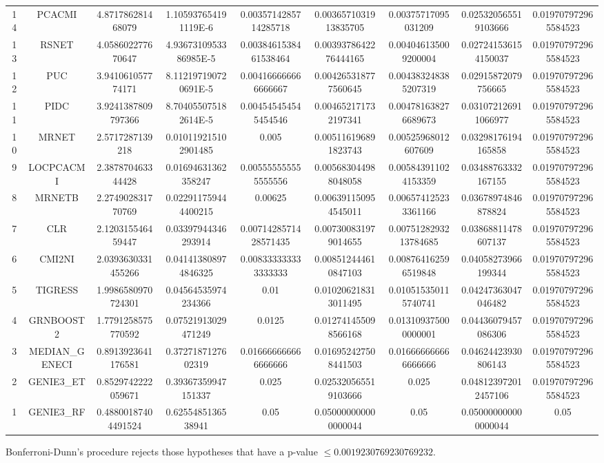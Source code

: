 \documentclass[a4paper,10pt]{article}
\begin{document}
\begin{landscape}
\begin{table}[!htp]
\begin{tabular}{ccccccccc}
14&PCACMI&4.871786281468079&1.105937654191119E-6&0.0035714285714285718&0.0036571031913835705&0.00375717095031209&0.025320565519103666&0.019707972965584523\\
13&RSNET&4.058602277670647&4.9367310953386985E-5&0.0038461538461538464&0.0039378642276444165&0.004046135009200004&0.027241536154150037&0.019707972965584523\\
12&PUC&3.941061057774171&8.112197190720691E-5&0.004166666666666667&0.004265318777560645&0.004383248385207319&0.02915872079756665&0.019707972965584523\\
11&PIDC&3.9241387809797366&8.704055075182614E-5&0.004545454545454546&0.004652171732197341&0.004781638276689673&0.031072126911066977&0.019707972965584523\\
10&MRNET&2.5717287139218&0.010119215102901485&0.005&0.005116196891823743&0.00525968012607609&0.03298176194165858&0.019707972965584523\\
9&LOCPCACMI&2.387870463344428&0.01694631362358247&0.005555555555555556&0.005683044988048058&0.005843911024153359&0.03488763332167155&0.019707972965584523\\
8&MRNETB&2.274902831770769&0.022911759444400215&0.00625&0.006391150954545011&0.006574125233361166&0.03678974846878824&0.019707972965584523\\
7&CLR&2.120315546459447&0.03397944346293914&0.0071428571428571435&0.007300831979014655&0.0075128293213784685&0.03868811478607137&0.019707972965584523\\
6&CMI2NI&2.0393630331455266&0.041413808974846325&0.008333333333333333&0.008512444610847103&0.008764162596519848&0.04058273966199344&0.019707972965584523\\
5&TIGRESS&1.9986580970724301&0.04564535974234366&0.01&0.010206218313011495&0.010515350115740741&0.04247363047046482&0.019707972965584523\\
4&GRNBOOST2&1.7791258575770592&0.07521913029471249&0.0125&0.012741455098566168&0.013109375000000001&0.04436079457086306&0.019707972965584523\\
3&MEDIAN_GENECI&0.8913923641176581&0.3727187127602319&0.016666666666666666&0.016952427508441503&0.016666666666666666&0.04624423930806143&0.019707972965584523\\
2&GENIE3_ET&0.8529742222059671&0.39367359947151337&0.025&0.025320565519103666&0.025&0.048123972012457106&0.019707972965584523\\
1&GENIE3_RF&0.48800187404491524&0.6255485136538941&0.05&0.050000000000000044&0.05&0.050000000000000044&0.05\\
\hline
\end{tabular}
\end{table}
Bonferroni-Dunn's procedure rejects those hypotheses that have a p-value $\le0.0019230769230769232$.



\end{landscape}
\end{document}
